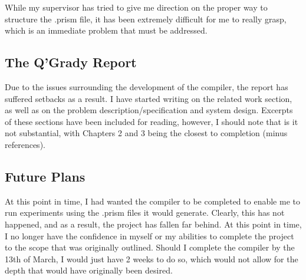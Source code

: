 \documentclass[report.tex]{subfiles}
\begin{document}
While my supervisor has tried to give me direction on the proper way to
structure the .prism file, it has been extremely difficult for me to really
grasp, which is an immediate problem that must be addressed.

\subsection{The Q'Grady Report} %
\label{sub:the_q_grady_report}
Due to the issues surrounding the development of the compiler, the report has
suffered setbacks as a result. I have started writing on the related work
section, as well as on the problem description/specification and system design.
Excerpts of these sections have been included for reading, however, I should
note that is it not substantial, with Chapters 2 and 3 being the closest to
completion (minus references).

\subsection{Future Plans} %
\label{sub:future_plans}
At this point in time, I had wanted the compiler to be completed to enable me to
run experiments using the .prism files it would generate. Clearly, this has not
happened, and as a result, the project has fallen far behind. At this point in
time, I no longer have the confidence in myself or my abilities to complete the
project to the scope that was originally outlined. Should I complete the
compiler by the 13th of March, I would just have 2 weeks to do so, which would
not allow for the depth that would have originally been desired.

\newpage
\end{document}
